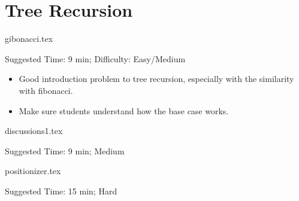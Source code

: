 \documentclass{exam}
\begin{document}
\section{Tree Recursion}
\begin{questions}
    {gibonacci.tex}
    \begin{questionmeta}
        Suggested Time: 9 min; Difficulty: Easy/Medium
        \begin{itemize}
            \item  Good introduction problem to tree recursion, especially with the similarity with fibonacci. 
            \item Make sure students understand how the base case works. 
        \end{itemize}
      \end{questionmeta}    
      
      {discussions1.tex}
      \begin{questionmeta}
          Suggested Time: 9 min; Medium
        \end{questionmeta}

        {positionizer.tex}
        \begin{questionmeta}
            Suggested Time: 15 min; Hard
          \end{questionmeta}


        
\end{questions}
\end{document}
